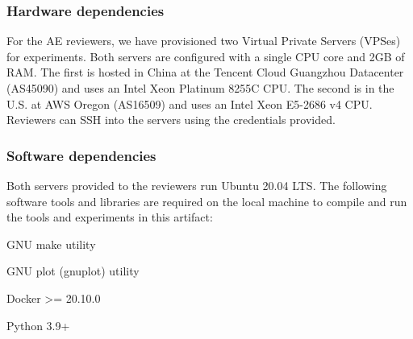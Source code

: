 \subsubsection{Hardware dependencies}
For the AE reviewers,
we have provisioned two Virtual Private Servers (VPSes) for experiments.
Both servers are configured with a single CPU core and 2GB of RAM. 
The first is hosted in
China at the Tencent Cloud Guangzhou Datacenter
(AS45090) and uses an Intel Xeon Platinum 8255C CPU.
The second is in the U.S. at AWS Oregon (AS16509) and
uses an Intel Xeon E5-2686 v4 CPU. Reviewers can SSH into the servers 
using the credentials provided.


\subsubsection{Software dependencies}
Both servers provided to the reviewers run Ubuntu 20.04 LTS.
The following software tools and libraries are required
on the local machine to compile and run the
tools and experiments in this artifact:

\begin{compactitem}
    \item GNU make utility
    \item GNU plot (gnuplot) utility
    \item Docker >= 20.10.0
    \item Python 3.9+
\end{compactitem}

